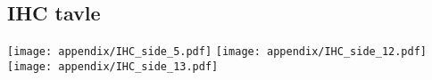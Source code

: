 \subsection{IHC tavle}
\texttt{[image: appendix/IHC\_side\_5.pdf]}
\newpage
\texttt{[image: appendix/IHC\_side\_12.pdf]}
\newpage
\texttt{[image: appendix/IHC\_side\_13.pdf]}